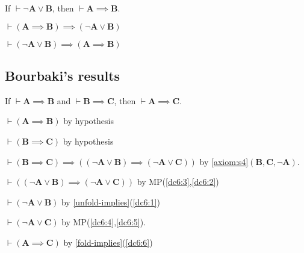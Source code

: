 \documentclass{amsart}%
\newcommand\metavariable[1]{\boldsymbol{#1}}
\begin{document}
\begin{syn}\label{fold-implies}
If $\vdash\neg\metavariable{A}\lor\metavariable{B}$,
then $\vdash\metavariable{A}\implies\metavariable{B}$.
\end{syn}

\begin{syn}\label{syn:tautology:implies-to-lor}
$\vdash(\metavariable{A}\implies\metavariable{B})\implies(\neg\metavariable{A}\lor\metavariable{B})$
\end{syn}

\begin{syn}\label{syn:tautology:lor-to-implies}
$\vdash(\neg\metavariable{A}\lor\metavariable{B})\implies(\metavariable{A}\implies\metavariable{B})$
\end{syn}

\subsection{Bourbaki's results}

\begin{dc}\label{dc:6}
If $\vdash\metavariable{A}\implies\metavariable{B}$
and $\vdash\metavariable{B}\implies\metavariable{C}$,
then $\vdash\metavariable{A}\implies\metavariable{C}$.
\end{dc}

\begin{pf}
\item\label{dc6:1} $\vdash(\metavariable{A}\implies\metavariable{B})$
  by hypothesis
\item\label{dc6:2} $\vdash(\metavariable{B}\implies\metavariable{C})$
  by hypothesis
\item\label{dc6:3} $\vdash(\metavariable{B}\implies\metavariable{C})\implies((\neg\metavariable{A}\lor\metavariable{B})\implies(\neg\metavariable{A}\lor\metavariable{C}))$
  by \ref{axiom:s4}$(\metavariable{B},\metavariable{C},\neg\metavariable{A})$.
\item\label{dc6:4} $\vdash((\neg\metavariable{A}\lor\metavariable{B})\implies(\neg\metavariable{A}\lor\metavariable{C}))$
  by MP(\ref{dc6:3},\ref{dc6:2})
\item\label{dc6:5} $\vdash(\neg\metavariable{A}\lor\metavariable{B})$
  by \ref{unfold-implies}(\ref{dc6:1})
\item\label{dc6:6} $\vdash(\neg\metavariable{A}\lor\metavariable{C})$ by MP(\ref{dc6:4},\ref{dc6:5}).
\item\label{dc6:7} $\vdash(\metavariable{A}\implies\metavariable{C})$ by \ref{fold-implies}(\ref{dc6:6})
\end{pf}
\end{document}

